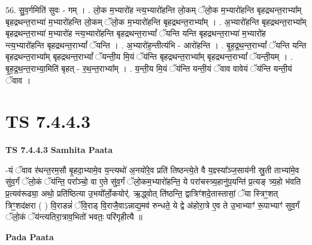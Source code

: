 \documentclass[17pt]{extarticle}
\begin{document}
56. सु॒व॒र्गमिति॑ सुवः - गम् । . लो॒क म॒भ्यारो॑ह न्त्य॒भ्यारो॑हन्ति लो॒कम् ॅलो॒क म॒भ्यारो॑हन्ति बृहद्रथन्त॒राभ्या᳚म् बृहद्रथन्त॒राभ्या॑ म॒भ्यारो॑हन्ति लो॒कम् ॅलो॒क म॒भ्यारो॑हन्ति बृहद्रथन्त॒राभ्या᳚म् । . अ॒भ्यारो॑हन्ति बृहद्रथन्त॒राभ्या᳚म् बृहद्रथन्त॒राभ्या॑ म॒भ्यारो॑ह न्त्य॒भ्यारो॑हन्ति बृहद्रथन्त॒राभ्यां᳚ ॅयन्ति यन्ति बृहद्रथन्त॒राभ्या॑ म॒भ्यारो॑ह न्त्य॒भ्यारो॑हन्ति बृहद्रथन्त॒राभ्यां᳚ ॅयन्ति । . अ॒भ्यारो॑ह॒न्तीत्य॑भि - आरो॑हन्ति । . बृ॒ह॒द्र॒थ॒न्त॒राभ्यां᳚ ॅयन्ति यन्ति बृहद्रथन्त॒राभ्या᳚म् बृहद्रथन्त॒राभ्यां᳚ ॅयन्ती॒य मि॒यं ॅय॑न्ति बृहद्रथन्त॒राभ्या᳚म् बृहद्रथन्त॒राभ्यां᳚ ॅयन्ती॒यम् । . बृ॒ह॒द्र॒थ॒न्त॒राभ्या॒मिति॑ बृहत् - र॒थ॒न्त॒राभ्या᳚म् । . य॒न्ती॒य मि॒यं ॅय॑न्ति यन्ती॒यं ॅवाव वावेयं ॅय॑न्ति यन्ती॒यं ॅवाव । \newline
\pagebreak
{}

\section{ TS 7.4.4.3 }

\textbf{TS 7.4.4.3 } \newline
\textbf{Samhita Paata} \newline

-यं ॅवाव र॑थन्त॒रम॒सौ बृ॒हदा॒भ्यामे॒व य॒न्त्यथो॑ अ॒नयो॑रे॒व प्रति॑ तिष्ठन्त्ये॒ते वै य॒ज्ञ्स्या᳚ञ्ज॒साय॑नी स्रु॒ती ताभ्या॑मे॒व सु॑व॒र्गं ॅलो॒कं ॅय॑न्ति॒ परा᳚ञ्चो॒ वा ए॒ते सु॑व॒र्गं ॅलो॒कम॒भ्यारो॑हन्ति॒ ये परा॑चस्त्र्य॒हानु॑प॒यन्ति॑ प्र॒त्यङ् त्र्य॒हो भ॑वति प्र॒त्यव॑रूढ्या॒ अथो॒ प्रति॑ष्ठित्या उ॒भयो᳚र्लो॒कयोर्॑. ऋ॒द्ध्वोत् ति॑ष्ठन्ति॒ द्वात्रिꣳ॑शदे॒तास्तासां॒ ॅया स्त्रिꣳ॒॒शत् त्रिꣳ॒॒शद॑क्षरा ( ) वि॒राडन्नं॑ ॅवि॒राड् वि॒राजै॒वाऽन्नाद्य॒मव॑ रुन्धते॒ ये द्वे अ॑होरा॒त्रे ए॒व ते उ॒भाभ्याꣳ॑ रू॒पाभ्याꣳ॑ सुव॒र्गं ॅलो॒कं ॅय॑न्त्यतिरा॒त्राव॒भितो॑ भवतः॒ परि॑गृहीत्यै ॥ \newline

\textbf{Pada Paata} \newline
\end{document}

